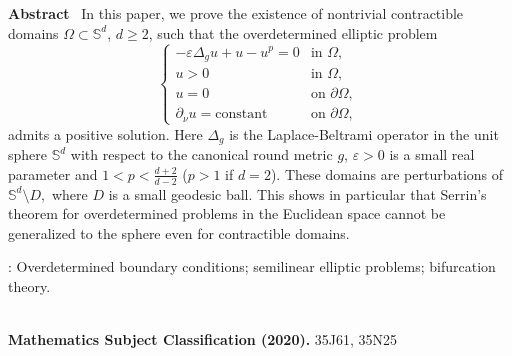 \documentclass[reqno]{amsart}
\numberwithin{equation}{section}
\newenvironment{abs}{\textbf{Abstract}\mbox{  }}{ }
\newenvironment{key words}{\textbf{Keywords}\mbox{  }}{ }
\begin{document}
\noindent
\begin{abs}
In this paper, we prove the existence of nontrivial contractible domains $\Omega\subset\mathbb{S}^{d}$, $d\geq2$, such that the overdetermined elliptic problem
\begin{equation*}
  \begin{cases}
  -\varepsilon\Delta_{g} u +u-u^{p}=0 &\mbox{in $\Omega$, }\\
   u>0 &\mbox{in $\Omega$, }\\
  u=0 &\mbox{on $\partial\Omega$, }\\
  \partial_{\nu} u=\mbox{constant} &\mbox{on $\partial\Omega$, }
  \end{cases}
\end{equation*}
admits a positive solution. Here $\Delta_{g}$ is the Laplace-Beltrami operator in the unit sphere $\mathbb{S}^{d}$ with respect to the canonical round metric $g$, $\varepsilon>0$ is a small real parameter and $1<p<\frac{d+2}{d-2}$ ($p>1$ if $d=2$). These domains are perturbations of $\mathbb{S}^{d}\setminus D,$ where $D$ is a small geodesic ball. This shows in particular that Serrin's theorem for overdetermined problems in the Euclidean space cannot be generalized to the sphere even for contractible domains.
\end{abs}\\
\begin{key words}: Overdetermined boundary conditions; semilinear elliptic problems; bifurcation theory.
\end{key words}\\
\textbf{Mathematics Subject Classification (2020).}
35J61, 35N25
 \indent








\end{document}
